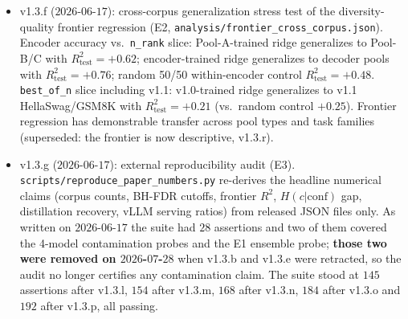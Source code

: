 \documentclass[11pt]{article}
\begin{document}
\begin{itemize}[leftmargin=*]
\item v1.3.f ($2026$-$06$-$17$): cross-corpus generalization stress test of the diversity-quality frontier regression (E2, \texttt{analysis/\allowbreak frontier\_\allowbreak cross\_\allowbreak corpus.\allowbreak json}). Encoder accuracy vs.\ \texttt{n\_rank} slice: Pool-A-trained ridge generalizes to Pool-B/C with $R^2_{\text{test}}{=}{+}0.62$; encoder-trained ridge generalizes to decoder pools with $R^2_{\text{test}}{=}{+}0.76$; random 50/50 within-encoder control $R^2_{\text{test}}{=}{+}0.48$. \texttt{best\_of\_n} slice including v1.1: v1.0-trained ridge generalizes to v1.1 HellaSwag/GSM8K with $R^2_{\text{test}}{=}{+}0.21$ (vs.\ random control $+0.25$). Frontier regression has demonstrable transfer across pool types and task families (superseded: the frontier is now descriptive, v1.3.r).
\item v1.3.g ($2026$-$06$-$17$): external reproducibility audit (E3). \texttt{scripts/\allowbreak reproduce\_\allowbreak paper\_\allowbreak numbers.\allowbreak py} re-derives the headline numerical claims (corpus counts, BH-FDR cutoffs, frontier $R^2$, $H(c|\mathrm{conf})$ gap, distillation recovery, vLLM serving ratios) from released JSON files only. As written on $2026$-$06$-$17$ the suite had $28$ assertions and two of them covered the 4-model contamination probes and the E1 ensemble probe; \textbf{those two were removed on $2026$-$07$-$28$} when v1.3.b and v1.3.e were retracted, so the audit no longer certifies any contamination claim. The suite stood at $145$ assertions after v1.3.l, $154$ after v1.3.m, $168$ after v1.3.n, $184$ after v1.3.o and $192$ after v1.3.p, all passing.

\end{itemize}
\end{document}
